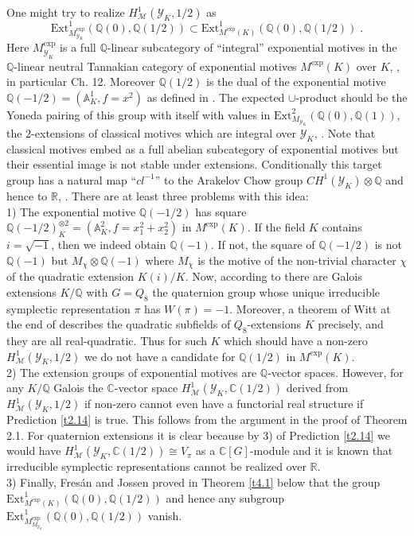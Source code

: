 \documentclass[12pt,leqno]{article}
\newcommand{\A}{{\mathbb{A}}}
\newcommand{\C}{{\mathbb{C}}}
\newcommand{\Q}{{\mathbb{Q}}}
\newcommand{\R}{{\mathbb{R}}}
\newcommand{\Ext}{\mathrm{Ext}}
\newcommand{\Mh}{{\mathcal M}}
\newcommand{\Yh}{\mathcal{Y}}
\begin{document}
One might try to realize $H^1_{\Mh} (\Yh_K , 1/2)$ as 
\[
\Ext^1_{M^{\exp}_{\Yh_K}} (\Q (0) , \Q (1/2)) \subset \Ext^1_{M^{\exp} (K)} (\Q (0) , \Q (1/2)) \; .
\]
Here $M^{\exp}_{\Yh_K}$ is a full $\Q$-linear subcategory of ``integral'' exponential motives in the $\Q$-linear neutral Tannakian category of exponential motives $M^{\exp} (K)$ over $K$, \cite{FJ}, in particular Ch. 12. Moreover $\Q (1/2)$ is the dual of the exponential motive $\Q (-1/2) = (\A^1_K , f = x^2)$ as defined in \cite[12.2]{FJ}. The expected $\cup$-product should be the Yoneda pairing of this group with itself with values in $\Ext^2_{M_{\Yh_K}} (\Q (0) , \Q (1))$, the $2$-extensions of classical motives which are integral over $\Yh_K$, \cite{DN}. Note that classical motives embed as a full abelian subcategory of exponential motives but their essential image is not stable under extensions. Conditionally this target group has a natural map ``$cl^{-1}$'' to the Arakelov Chow group $CH^1 (\Yh_K) \otimes \Q$ and hence to $\R$, \cite{DN}. There are at least three problems with this idea: \\
1) The exponential motive $\Q (-1/2)$ has square $\Q (-1/2)^{\otimes 2}_K = (\A^2_K , f = x^2_1 + x^2_2)$ in $M^{\exp} (K)$. If the field $K$ contains $i = \sqrt{-1}$, then we indeed obtain $\Q (-1)$. If not, the square of $\Q (-1/2)$ is not $\Q (-1)$ but $M_{\chi} \otimes \Q (-1)$ where $M_{\chi}$ is the motive of the non-trivial character $\chi$ of the quadratic extension $K(i) / K$. Now, according to \cite{O} there are Galois extensions $K / \Q$ with $G = Q_8$ the quaternion group whose unique irreducible symplectic representation $\pi$ has $W (\pi) = -1$. Moreover, a theorem of Witt at the end of \cite{W} describes the quadratic subfields of $Q_8$-extensions $K$ precisely, and they are all real-quadratic. Thus for such $K$ which should have a non-zero $H^1_{\Mh} (\Yh_K , 1/2)$ we do not have a candidate for $\Q (1/2)$ in $M^{\exp} (K)$. \\
2) The extension groups of exponential motives are $\Q$-vector spaces. However, for any $K / \Q$ Galois the $\C$-vector space $H^1_{\Mh} (\Yh_K , \C (1/2))$ derived from $H^1_{\Mh} (\Yh_K , 1/2)$ if non-zero cannot even have a functorial real structure if Prediction \ref{t2.14} is true. This follows from the argument in the proof of \cite{D2} Theorem 2.1. For quaternion extensions it is clear because by 3) of Prediction \ref{t2.14} we would have $H^1_{\Mh} (\Yh_K , \C (1/2)) \cong V_{\pi}$ as a $\C [G]$-module and it is known that irreducible symplectic representations cannot be realized over $\R$. \\
3) Finally, Fres\'an and Jossen proved in Theorem \ref{t4.1} below that the group \\
$\Ext^1_{M^{\exp}(K)} (\Q (0) , \Q (1/2))$ and hence any subgroup $\Ext^1_{M^{\exp}_{M_{\Yh_K}}} (\Q (0) , \Q (1/2))$ vanish. 
\end{document}

